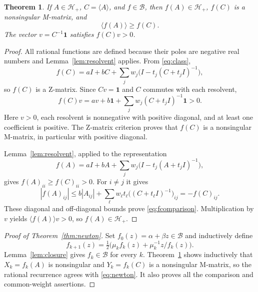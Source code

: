 \documentclass[11pt]{article}
\newtheorem{theorem}{Theorem}
\newcommand{\comp}[1]{\langle #1\rangle}
\newcommand{\ones}{\mathbf 1}
\begin{document}
\begin{theorem}\label{thm:preserver}
If $A\in\mathcal H_+$, $C=\comp A$, and $f\in\mathcal B$, then $f(A)\in\mathcal H_+$, $f(C)$ is a nonsingular M-matrix, and
\begin{equation}\label{eq:fcomparison}
\comp{f(A)}\ge f(C).
\end{equation}
The vector $v=C^{-1}\ones$ satisfies $f(C)v>0$.
\end{theorem}
\begin{proof}
All rational functions are defined because their poles are negative real numbers and Lemma~\ref{lem:resolvent} applies. From \eqref{eq:class},
\[
f(C)=aI+bC+\sum_jw_j\bigl(I-t_j(C+t_jI)^{-1}\bigr),
\]
so $f(C)$ is a Z-matrix. Since $Cv=\ones$ and $C$ commutes with each resolvent,
\[
f(C)v=av+b\ones+\sum_jw_j(C+t_jI)^{-1}\ones>0.
\]
Here $v>0$, each resolvent is nonnegative with positive diagonal, and at least one coefficient is positive. The Z-matrix criterion proves that $f(C)$ is a nonsingular M-matrix, in particular with positive diagonal.

Lemma~\ref{lem:resolvent}, applied to the representation
\[
f(A)=aI+bA+\sum_jw_j\bigl(I-t_j(A+t_jI)^{-1}\bigr),
\]
gives $f(A)_{ii}\ge f(C)_{ii}>0$. For $i\ne j$ it gives
\[
|f(A)_{ij}|\le b|A_{ij}|+\sum_{\ell} w_{\ell}t_{\ell}\bigl((C+t_{\ell}I)^{-1}\bigr)_{ij}
=-f(C)_{ij}.
\]
These diagonal and off-diagonal bounds prove \eqref{eq:fcomparison}. Multiplication by $v$ yields $\comp{f(A)}v>0$, so $f(A)\in\mathcal H_+$.
\end{proof}

\begin{proof}[Proof of Theorem~\ref{thm:newton}]
Set $f_0(z)=\alpha+\beta z\in\mathcal B$ and inductively define
\[
f_{k+1}(z)=\tfrac12\bigl(\mu_k f_k(z)+\mu_k^{-1}z/f_k(z)\bigr).
\]
Lemma~\ref{lem:closure} gives $f_k\in\mathcal B$ for every $k$. Theorem~\ref{thm:preserver} shows inductively that $X_k=f_k(A)$ is nonsingular and $Y_k=f_k(C)$ is a nonsingular M-matrix, so the rational recurrence agrees with \eqref{eq:newton}. It also proves all the comparison and common-weight assertions.
\end{proof}
\end{document}

